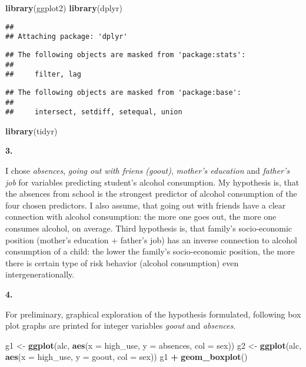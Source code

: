 \documentclass[]{article}
\newenvironment{Shaded}{\begin{snugshade}}{\end{snugshade}}
\newcommand{\DataTypeTok}[1]{\textcolor[rgb]{0.13,0.29,0.53}{#1}}
\newcommand{\KeywordTok}[1]{\textcolor[rgb]{0.13,0.29,0.53}{\textbf{#1}}}
\newcommand{\NormalTok}[1]{#1}
\newcommand{\OperatorTok}[1]{\textcolor[rgb]{0.81,0.36,0.00}{\textbf{#1}}}
\newcommand{\StringTok}[1]{\textcolor[rgb]{0.31,0.60,0.02}{#1}}
\begin{document}
\begin{Shaded}
\begin{Highlighting}[]
\KeywordTok{library}\NormalTok{(ggplot2)}
\KeywordTok{library}\NormalTok{(dplyr)}
\end{Highlighting}
\end{Shaded}

\begin{verbatim}
## 
## Attaching package: 'dplyr'
\end{verbatim}

\begin{verbatim}
## The following objects are masked from 'package:stats':
## 
##     filter, lag
\end{verbatim}

\begin{verbatim}
## The following objects are masked from 'package:base':
## 
##     intersect, setdiff, setequal, union
\end{verbatim}

\begin{Shaded}
\begin{Highlighting}[]
\KeywordTok{library}\NormalTok{(tidyr)}
\end{Highlighting}
\end{Shaded}

\textbf{3.}

I chose \emph{absences}, \emph{going out with friens (goout)},
\emph{mother's education} and \emph{father's job} for variables
predicting student's alcohol consumption. My hypothesis is, that the
absences from school is the strongest predictor of alcohol consumption
of the four chosen predictors. I also assume, that going out with
friends have a clear connection with alcohol consumption: the more one
goes out, the more one consumes alcohol, on average. Third hypothesis
is, that family's socio-economic position (mother's education + father's
job) has an inverse connection to alcohol consumption of a child: the
lower the family's socio-economic position, the more there is certain
type of risk behavior (alcohol consumption) even intergenerationally.

\textbf{4.}

For preliminary, graphical exploration of the hypothesis formulated,
following box plot graphs are printed for integer variables \emph{goout}
and \emph{absences}.

\begin{Shaded}
\begin{Highlighting}[]
\NormalTok{g1 <-}\StringTok{ }\KeywordTok{ggplot}\NormalTok{(alc, }\KeywordTok{aes}\NormalTok{(}\DataTypeTok{x =}\NormalTok{ high_use, }\DataTypeTok{y =}\NormalTok{ absences, }\DataTypeTok{col =}\NormalTok{ sex))}
\NormalTok{g2 <-}\StringTok{ }\KeywordTok{ggplot}\NormalTok{(alc, }\KeywordTok{aes}\NormalTok{(}\DataTypeTok{x =}\NormalTok{ high_use, }\DataTypeTok{y =}\NormalTok{ goout, }\DataTypeTok{col =}\NormalTok{ sex))}
\NormalTok{g1 }\OperatorTok{+}\StringTok{ }\KeywordTok{geom_boxplot}\NormalTok{()}
\end{Highlighting}
\end{Shaded}
\end{document}
